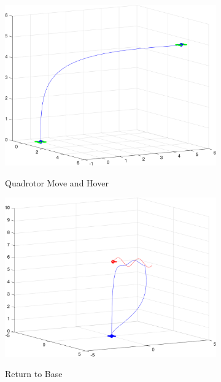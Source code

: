 \documentclass{article}
\begin{document}
\begin{figure}[H]
\centering
\begin{subfigure}[b]{0.31\textwidth}
    \centering
    \includegraphics[width = 1\textwidth]{images/MoveAndHover.png}
     \label{fig:MandH}
     \caption{Quadrotor Move and Hover}
\end{subfigure}
\begin{subfigure}[b]{0.31\textwidth}
    \centering
    \includegraphics[width = 1\textwidth]{images/ReturnToBase.png}
     \label{fig:Return}
     \caption{Return to Base}
 \end{subfigure}
\begin{subfigure}[b]{0.31\textwidth}
    \centering

\end{subfigure}
\end{figure}
\end{document}
